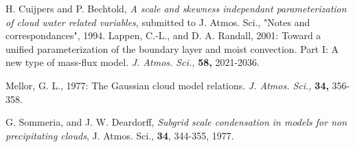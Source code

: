 \por   H. { Cuijpers} and P. { Bechtold},
           {\it A scale and skewness independant parameterization of
                cloud water related variables},
           submitted to J. Atmos. Sci., "Notes and correspondances", 1994.
\por
Lappen, C.-L., and D. A. Randall, 2001: Toward a unified parameterization of
the boundary layer and moist convection. Part I: A new type of mass-flux model.
{\it J. Atmos. Sci.,} {\bf 58,} 2021-2036.

\por
Mellor, G. L., 1977: The Gaussian cloud model relations.
{\it J. Atmos. Sci.,} {\bf 34,} 356-358.

\por   G. { Sommeria}, and J. W. { Deardorff},
           {\it Subgrid scale condensation in models for non precipitating
                clouds},
           J. Atmos. Sci., {\bf 34}, 344-355, 1977.

